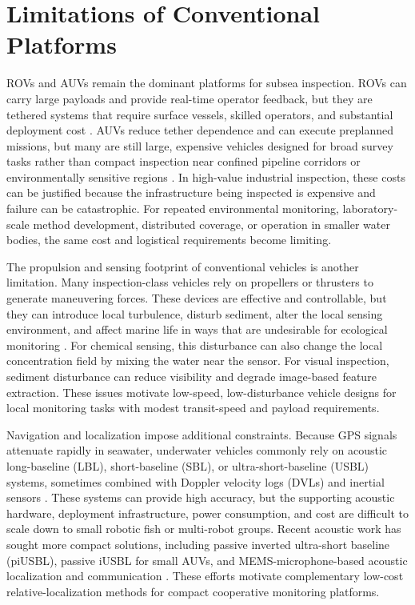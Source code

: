 \documentclass{uhcoethesis}
\begin{document}
\section{Limitations of Conventional Platforms}

ROVs and AUVs remain the dominant platforms for subsea inspection. ROVs can carry large payloads and provide real-time operator feedback, but they are tethered systems that require surface vessels, skilled operators, and substantial deployment cost \cite{Capocci2017,Shukla2016}. AUVs reduce tether dependence and can execute preplanned missions, but many are still large, expensive vehicles designed for broad survey tasks rather than compact inspection near confined pipeline corridors or environmentally sensitive regions \cite{Mcleod2012,Patel2024}. In high-value industrial inspection, these costs can be justified because the infrastructure being inspected is expensive and failure can be catastrophic. For repeated environmental monitoring, laboratory-scale method development, distributed coverage, or operation in smaller water bodies, the same cost and logistical requirements become limiting.

The propulsion and sensing footprint of conventional vehicles is another limitation. Many inspection-class vehicles rely on propellers or thrusters to generate maneuvering forces. These devices are effective and controllable, but they can introduce local turbulence, disturb sediment, alter the local sensing environment, and affect marine life in ways that are undesirable for ecological monitoring \cite{Marras2012,Polverino2013}. For chemical sensing, this disturbance can also change the local concentration field by mixing the water near the sensor. For visual inspection, sediment disturbance can reduce visibility and degrade image-based feature extraction. These issues motivate low-speed, low-disturbance vehicle designs for local monitoring tasks with modest transit-speed and payload requirements.

Navigation and localization impose additional constraints. Because GPS signals attenuate rapidly in seawater, underwater vehicles commonly rely on acoustic long-baseline (LBL), short-baseline (SBL), or ultra-short-baseline (USBL) systems, sometimes combined with Doppler velocity logs (DVLs) and inertial sensors \cite{Luo2021,Su2020,Zekavat2019}. These systems can provide high accuracy, but the supporting acoustic hardware, deployment infrastructure, power consumption, and cost are difficult to scale down to small robotic fish or multi-robot groups. Recent acoustic work has sought more compact solutions, including passive inverted ultra-short baseline (piUSBL), passive iUSBL for small AUVs, and MEMS-microphone-based acoustic localization and communication \cite{Rypkema2019,Wang2022,Hinduja2022}. These efforts motivate complementary low-cost relative-localization methods for compact cooperative monitoring platforms.
\end{document}
